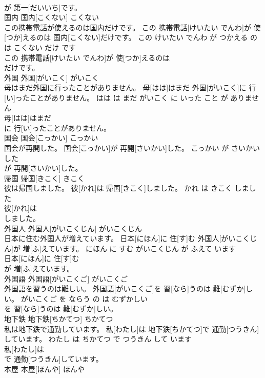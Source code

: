 \documentclass[8pt]{extreport}
\begin{document}
\begin{CJK}{UTF8}{min}
\\	が 第一[だいいち]です。			
\\	国内	国内[こくない]	こくない	
\\	この携帯電話が使えるのは国内だけです。	この 携帯電話[けいたい でんわ]が 使[つか]えるのは 国内[こくない]だけです。	この けいたい でんわ が つかえる の は こくない だけ です	
\\	この 携帯電話[けいたい でんわ]が 使[つか]えるのは
\\	だけです。			
\\	外国	外国[がいこく]	がいこく	
\\	母はまだ外国に行ったことがありません。	母[はは]はまだ 外国[がいこく]に 行[い]ったことがありません。	はは は まだ がいこく に いった こと が ありません	
\\	母[はは]はまだ
\\	に 行[い]ったことがありません。			
\\	国会	国会[こっかい]	こっかい	
\\	国会が再開した。	国会[こっかい]が 再開[さいかい]した。	こっかい が さいかい した	
\\	が 再開[さいかい]した。			
\\	帰国	帰国[きこく]	きこく	
\\	彼は帰国しました。	彼[かれ]は 帰国[きこく]しました。	かれ は きこく しました	
\\	彼[かれ]は
\\	しました。			
\\	外国人	外国人[がいこくじん]	がいこくじん	
\\	日本に住む外国人が増えています。	日本[にほん]に 住[す]む 外国人[がいこくじん]が 増[ふ]えています。	にほん に すむ がいこくじん が ふえて います	
\\	日本[にほん]に 住[す]む
\\	が 増[ふ]えています。			
\\	外国語	外国語[がいこくご]	がいこくご	
\\	外国語を習うのは難しい。	外国語[がいこくご]を 習[なら]うのは 難[むずか]しい。	がいこくご を ならう の は むずかしい	
\\	を 習[なら]うのは 難[むずか]しい。			
\\	地下鉄	地下鉄[ちかてつ]	ちかてつ	
\\	私は地下鉄で通勤しています。	私[わたし]は 地下鉄[ちかてつ]で 通勤[つうきん]しています。	わたし は ちかてつ で つうきん して います	
\\	私[わたし]は
\\	で 通勤[つうきん]しています。			
\\	本屋	本屋[ほんや]	ほんや	

\end{CJK}
\end{document}
